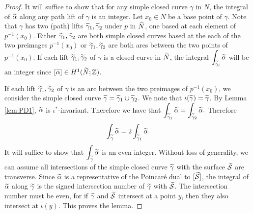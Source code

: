 \begin{proof}
 It will suffice to show that for any simple closed curve $\gamma$ in $N$, the integral of $\widetilde{\alpha}$ along any path lift of $\gamma$ is an integer.  Let $x_0\in N$ be a base point of $\gamma$.  Note that $\gamma$ has two (path) lifts $\widetilde{\gamma}_1,\widetilde{\gamma}_2$ under $p$ in $\widetilde{N}$, one based at each element of $p^{-1}(x_0)$.  Either $\widetilde{\gamma}_1,\widetilde{\gamma}_2$ are both simple closed curves based at the each of the two preimages $p^{-1}(x_0)$ or $\widetilde{\gamma}_1,\widetilde{\gamma}_2$ are both arcs between the two points of $p^{-1}(x_0)$.
  If each lift $\widetilde{\gamma}_1,\widetilde{\gamma}_2$ of $\gamma$ is a closed curve in $\widetilde{N}$, the integral $\displaystyle\int_{\widetilde{\gamma}_i}\widetilde{\alpha}$ will be an integer since $[\widetilde{\alpha}] \in H^1(\widetilde{N}; \mathbb{Z})$.

 If each lift $\widetilde{\gamma}_1,\widetilde{\gamma}_2$ of $\gamma$ is an arc between the two preimages of $p^{-1}(x_0)$, we consider the simple closed curve $\widetilde{\gamma}=\widetilde{\gamma}_1\cup\widetilde{\gamma}_2$.  We note that $\iota(\widetilde{\gamma})=\widetilde{\gamma}$.
  By Lemma \ref{lem:PD1}, $\widetilde{\alpha}$ is $\iota^{\ast}$-invariant.  Therefore we have that $ \displaystyle\int_{\widetilde{\gamma}_1} \widetilde{\alpha} = \displaystyle\int_{\widetilde{\gamma}_2} \widetilde{\alpha}.$  Therefore $$\int_{\widetilde{\gamma}}\widetilde{\alpha}=2\int_{\widetilde{\gamma}_1}\widetilde{\alpha}.$$ It will suffice to show that $\displaystyle\int_{\widetilde{\gamma}}\widetilde{\alpha}$ is an even integer.
  Without loss of generality, we can assume all intersections of the simple closed curve $\widetilde{\gamma}$ with the surface $\widetilde{\mathcal{S}}$ are transverse.
  Since $\widetilde{\alpha}$ is a representative of the Poincar\'e dual to $[\widetilde{\mathcal{S}}]$, the integral of $\widetilde{\alpha}$ along $\widetilde{\gamma}$ is the signed intersection number of $\widetilde{\gamma}$ with $\widetilde{\mathcal{S}}$.
  The intersection number must be even, for if $\widetilde{\gamma}$ and $\widetilde{\mathcal{S}}$ intersect at a point $y$, then they also intersect at $\iota(y)$. This proves the lemma.
\end{proof}

